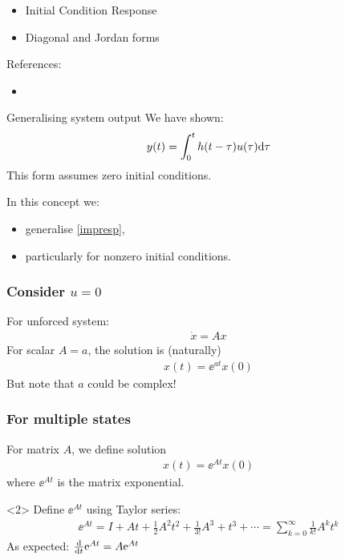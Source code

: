 \documentclass{beamer-control}
\begin{document}

\begin{SUMMARY}
\begin{itemize}
\item Initial Condition Response
\item Diagonal and Jordan forms
\end{itemize}
\vfill References:
\begin{itemize}
\item {}
\end{itemize}
\end{SUMMARY}




\begin{frame}{Generalising system output}
We have shown:
\begin{align}\label{eq:impresp}
y(t) = \int^t_0 h(t-\tau)u(\tau)\mathrm{d}\tau
\end{align}
This form assumes zero initial conditions.

In this concept we:
\begin{itemize}
\item generalise  \eqref{impresp},
\item particularly for nonzero initial conditions.
\end{itemize}
\end{frame}

\begin{frame}
\frametitle{Consider $u=0$}
For unforced system:
\begin{align}
\dot x = A x
\end{align}
For scalar $A=a$, the solution is (naturally)
\begin{align}
x(t) = \ee^{at}x(0)
\end{align}
But note that $a$ could be complex!
\end{frame}

\begin{frame}
\frametitle{For multiple states}

For matrix $A$, we define solution
\begin{align}
x(t) = \ee^{At} x(0)
\end{align}
where $\ee^{At}$ is the \alert{matrix exponential}.
\bigskip

\begin{uncoverenv}<2>
Define $\ee^{At}$ using Taylor series:
\begin{align}
\ee^{At} = I + At + \tfrac12 A^2t^2 + \tfrac{1}{3!}A^3+t^3 + \cdots = \sum_{k=0}^{\infty} \tfrac{1}{k!}A^kt^k
\end{align}
As expected: $\frac{\mathrm{d} }{\mathrm{d} t} \mathrm{e}^{At} = A \mathrm{e}^{At}$
\end{uncoverenv}
\end{frame}
\end{document}

